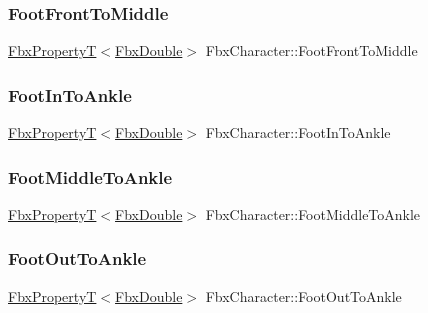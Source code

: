 \subsubsection{\texorpdfstring{Foot\+Front\+To\+Middle}{FootFrontToMiddle}}
{\footnotesize\ttfamily \hyperlink{class_fbx_property_t}{Fbx\+PropertyT}$<$\hyperlink{fbxtypes_8h_a171e72a1c46fc15c1a6c9c31948c1c5b}{Fbx\+Double}$>$ Fbx\+Character\+::\+Foot\+Front\+To\+Middle}

\mbox{\label{class_fbx_character_afcae422eca3e15efe65c5797a78fbf93}} 
\subsubsection{\texorpdfstring{Foot\+In\+To\+Ankle}{FootInToAnkle}}
{\footnotesize\ttfamily \hyperlink{class_fbx_property_t}{Fbx\+PropertyT}$<$\hyperlink{fbxtypes_8h_a171e72a1c46fc15c1a6c9c31948c1c5b}{Fbx\+Double}$>$ Fbx\+Character\+::\+Foot\+In\+To\+Ankle}

\mbox{\label{class_fbx_character_aba466d9e9ca0f585126b3f9712b4d1d0}} 
\subsubsection{\texorpdfstring{Foot\+Middle\+To\+Ankle}{FootMiddleToAnkle}}
{\footnotesize\ttfamily \hyperlink{class_fbx_property_t}{Fbx\+PropertyT}$<$\hyperlink{fbxtypes_8h_a171e72a1c46fc15c1a6c9c31948c1c5b}{Fbx\+Double}$>$ Fbx\+Character\+::\+Foot\+Middle\+To\+Ankle}

\mbox{\label{class_fbx_character_afd9ef7a16f7b7a80193e67c5e45a6d0b}} 
\subsubsection{\texorpdfstring{Foot\+Out\+To\+Ankle}{FootOutToAnkle}}
{\footnotesize\ttfamily \hyperlink{class_fbx_property_t}{Fbx\+PropertyT}$<$\hyperlink{fbxtypes_8h_a171e72a1c46fc15c1a6c9c31948c1c5b}{Fbx\+Double}$>$ Fbx\+Character\+::\+Foot\+Out\+To\+Ankle}

